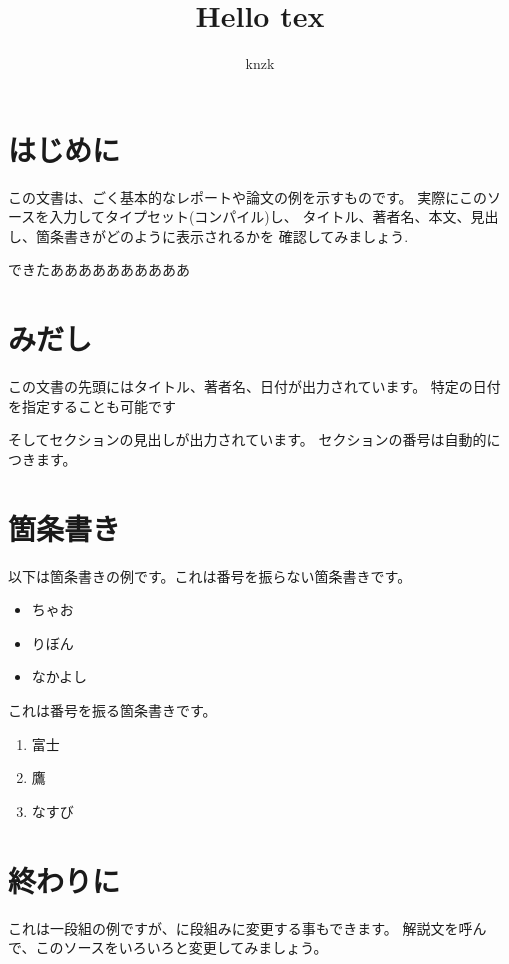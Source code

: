 \documentclass[dvipdfmx]{jsarticle}
\begin{document}
\title{Hello tex}
\author{knzk}
\maketitle

\section{はじめに}

この文書は、ごく基本的なレポートや論文の例を示すものです。
実際にこのソースを入力してタイプセット(コンパイル)し、
タイトル、著者名、本文、見出し、箇条書きがどのように表示されるかを
確認してみましょう.

できたああああああああああ

\section{みだし}

この文書の先頭にはタイトル、著者名、日付が出力されています。
特定の日付を指定することも可能です

そしてセクションの見出しが出力されています。
セクションの番号は自動的につきます。

\section{箇条書き}

以下は箇条書きの例です。これは番号を振らない箇条書きです。

\begin{itemize}
  \item ちゃお
  \item りぼん
  \item なかよし
\end{itemize}

これは番号を振る箇条書きです。
\begin{enumerate}
  \item 富士
  \item 鷹
  \item なすび
\end{enumerate}

\section{終わりに}

これは一段組の例ですが、に段組みに変更する事もできます。
解説文を呼んで、このソースをいろいろと変更してみましょう。
\end{document}
